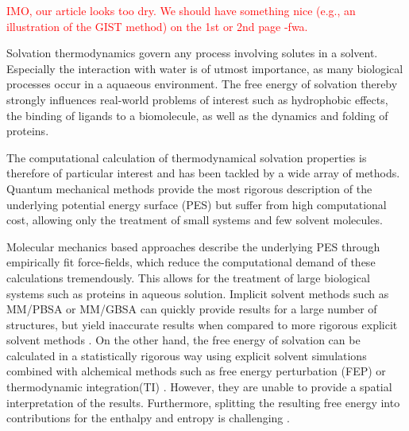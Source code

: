 \documentclass[9pt,tutorial]{livecoms}
\newcommand{\todo}{\textcolor{red}}
\begin{document}
\todo{IMO, our article looks too dry. We should have something nice (e.g., an illustration of the GIST method) on the 1st or 2nd page -fwa.}


Solvation thermodynamics govern any process involving solutes in a solvent.
Especially the interaction with water is of utmost importance, as many biological processes occur in a aquaeous environment. 
The free energy of solvation thereby strongly influences real-world problems of interest such as hydrophobic effects, the binding of ligands to a biomolecule, as well as the dynamics and folding of proteins.

The computational calculation of thermodynamical solvation properties is therefore of particular interest and has been tackled by a wide array of methods.
Quantum mechanical methods provide the most rigorous description of the underlying potential energy surface (PES) but suffer from high computational cost, allowing only the treatment of small systems and few solvent molecules. 

Molecular mechanics based approaches describe the underlying PES through empirically fit force-fields, which reduce the computational demand of these calculations tremendously.
This allows for the treatment of large biological systems such as proteins in aqueous solution.
Implicit solvent methods such as MM/PBSA or MM/GBSA \cite{Sitkoff1994-pbsa,Kollman2000-mmpbsa} can quickly provide results for a large number of structures, but yield inaccurate results when compared to more rigorous explicit solvent methods \cite{Genheden2015-mmpbsa-review}.
On the other hand, the free energy of solvation can be calculated in a statistically rigorous way using explicit solvent simulations combined with alchemical methods such as free energy perturbation (FEP) \cite{Zwanzig1954-reweighting} or thermodynamic integration(TI) \cite{Kirkwood1935-ti}.
However, they are unable to provide a spatial interpretation of the results.
Furthermore, splitting the resulting free energy into contributions for the enthalpy and entropy is challenging \cite{Peter2004-alchemical-entropy}.
\end{document}
